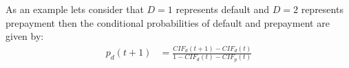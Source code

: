 \documentclass[12pt]{book}
\begin{document}
As an example lets consider that $D=1$ represents default
and $D=2$ represents prepayment then the conditional probabilities of default and prepayment are given by:
\begin{align}
p_d(t+1)&= \frac{CIF_d(t+1)-CIF_d(t)  }{
1- CIF_d(t)-CIF_p(t)}  
\end{align}


 
\end{document}
